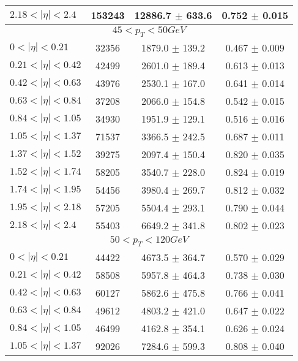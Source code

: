 \begin{tabular}{lccc}
$2.18 < |\eta| <2.4$           & 153243     & 12886.7    $\pm$ 633.6 & 0.752      $\pm$ 0.015 \\
\hline
\multicolumn{4}{c}{$45 < p_{T} < 50 GeV$} \\
\hline
$0 < |\eta| <0.21$             & 32356      & 1879.0     $\pm$ 139.2 & 0.467      $\pm$ 0.009 \\
$0.21 < |\eta| <0.42$          & 42499      & 2601.0     $\pm$ 189.4 & 0.613      $\pm$ 0.013 \\
$0.42 < |\eta| <0.63$          & 43976      & 2530.1     $\pm$ 167.0 & 0.641      $\pm$ 0.014 \\
$0.63 < |\eta| <0.84$          & 37208      & 2066.0     $\pm$ 154.8 & 0.542      $\pm$ 0.015 \\
$0.84 < |\eta| <1.05$          & 34930      & 1951.9     $\pm$ 129.1 & 0.516      $\pm$ 0.016 \\
$1.05 < |\eta| <1.37$          & 71537      & 3366.5     $\pm$ 242.5 & 0.687      $\pm$ 0.011 \\
$1.37 < |\eta| <1.52$          & 39275      & 2097.4     $\pm$ 150.4 & 0.820      $\pm$ 0.035 \\
$1.52 < |\eta| <1.74$          & 58205      & 3540.7     $\pm$ 228.0 & 0.824      $\pm$ 0.019 \\
$1.74 < |\eta| <1.95$          & 54456      & 3980.4     $\pm$ 269.7 & 0.812      $\pm$ 0.032 \\
$1.95 < |\eta| <2.18$          & 57205      & 5504.4     $\pm$ 293.1 & 0.790      $\pm$ 0.044 \\
$2.18 < |\eta| <2.4$           & 55403      & 6649.2     $\pm$ 341.8 & 0.802      $\pm$ 0.023 \\
\hline
\multicolumn{4}{c}{$50 < p_{T} < 120 GeV$} \\
\hline
$0 < |\eta| <0.21$             & 44422      & 4673.5     $\pm$ 364.7 & 0.570      $\pm$ 0.029 \\
$0.21 < |\eta| <0.42$          & 58508      & 5957.8     $\pm$ 464.3 & 0.738      $\pm$ 0.030 \\
$0.42 < |\eta| <0.63$          & 60127      & 5862.6     $\pm$ 475.8 & 0.766      $\pm$ 0.041 \\
$0.63 < |\eta| <0.84$          & 49612      & 4803.2     $\pm$ 421.0 & 0.647      $\pm$ 0.022 \\
$0.84 < |\eta| <1.05$          & 46499      & 4162.8     $\pm$ 354.1 & 0.626      $\pm$ 0.024 \\
$1.05 < |\eta| <1.37$          & 92026      & 7284.6     $\pm$ 599.3 & 0.808      $\pm$ 0.040 \\

\end{tabular}

